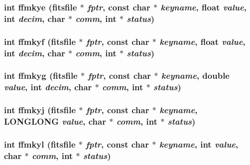 \subsubsection{\setlength{\rightskip}{0pt plus 5cm}int ffmkye (\bf{fitsfile} $\ast$ {\em fptr}, const char $\ast$ {\em keyname}, float {\em value}, int {\em decim}, char $\ast$ {\em comm}, int $\ast$ {\em status})}\label{test_2roimasker_2fitsio_8h_84fa2097111d3805d61b197d7a00ee78}


\subsubsection{\setlength{\rightskip}{0pt plus 5cm}int ffmkyf (\bf{fitsfile} $\ast$ {\em fptr}, const char $\ast$ {\em keyname}, float {\em value}, int {\em decim}, char $\ast$ {\em comm}, int $\ast$ {\em status})}\label{test_2roimasker_2fitsio_8h_a6e96904c21b62c82a78f38a345e7b39}


\subsubsection{\setlength{\rightskip}{0pt plus 5cm}int ffmkyg (\bf{fitsfile} $\ast$ {\em fptr}, const char $\ast$ {\em keyname}, double {\em value}, int {\em decim}, char $\ast$ {\em comm}, int $\ast$ {\em status})}\label{test_2roimasker_2fitsio_8h_cfca16506886068b451f7a977934509b}


\subsubsection{\setlength{\rightskip}{0pt plus 5cm}int ffmkyj (\bf{fitsfile} $\ast$ {\em fptr}, const char $\ast$ {\em keyname}, \bf{LONGLONG} {\em value}, char $\ast$ {\em comm}, int $\ast$ {\em status})}\label{test_2roimasker_2fitsio_8h_9337d5f08bcd5c82afc87256596ded23}


\subsubsection{\setlength{\rightskip}{0pt plus 5cm}int ffmkyl (\bf{fitsfile} $\ast$ {\em fptr}, const char $\ast$ {\em keyname}, int {\em value}, char $\ast$ {\em comm}, int $\ast$ {\em status})}\label{test_2roimasker_2fitsio_8h_b0edcf1260c7df986e19da627da36ee1}


